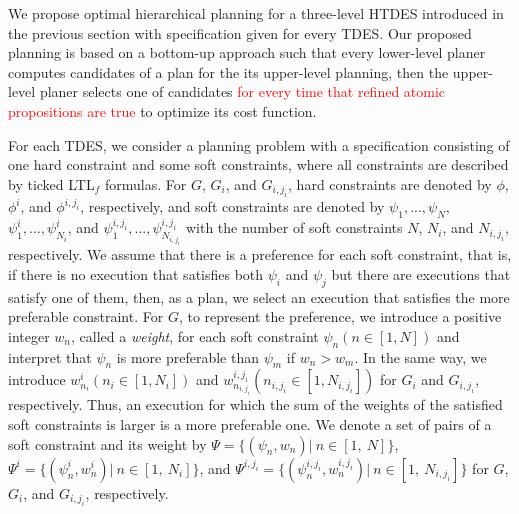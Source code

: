 \documentclass[journal,twoside,web]{IEEEtran}
\newcommand{\red}[1]{\textcolor{red}{#1}}
\begin{document}
We propose optimal hierarchical planning for a three-level HTDES introduced in the previous section with specification given for every TDES.
Our proposed planning is based on a bottom-up approach such that every lower-level planer computes candidates of a plan for the its upper-level planning, then the upper-level planer selects one of candidates \red{for every time that refined atomic propositions are true} to optimize its cost function.


For each TDES, we consider a planning problem with a specification consisting of one hard constraint and some soft constraints, where all constraints are described by ticked LTL$_f$ formulas. %
For $G$, $G_i$, and $G_{i,j_i}$, hard constraints are denoted by $\phi$, $\phi^i$, and $\phi^{i,j_i}$, respectively, and soft constraints are denoted by $\psi_1,...,\psi_N$, $\psi_1^i,...,\psi_{N_i}^i$, and $\psi_1^{i,j_i},...,\psi_{N_{i,j_i}}^{i,j_i}$ with the number of soft constraints $N$, $N_i$, and $N_{i,j_i}$, respectively. 
We assume that there is a preference for each soft constraint, that is, if there is no execution that satisfies both $\psi_i$ and $\psi_j$ but there are executions that satisfy one of them, then, as a plan, we select an execution that satisfies the more preferable constraint.  For $G$, to represent the preference, we introduce a positive integer $w_n$, called a {\sl weight}, for each soft constraint $\psi_n (n \in [1,N])$ and interpret that $\psi_n$ is more preferable than $\psi_m$ if $w_n >w_m$. 
In the same way, we introduce $w_{n_i}^i (n_i \in [1,N_i])$ and $w_{n_{i,j_i}}^{i,j_i} (n_{i,j_i} \in [1,N_{i,j_i}])$ for $G_i$ and $G_{i,j_i}$, respectively.
Thus, an execution for which the sum of the weights of the satisfied soft constraints is larger is a more preferable one.
We denote a set of pairs of a soft constraint and its weight by $\Psi=\{(\psi_n, w_n)|~n\in[1,~N]\}$, $\Psi^i=\{(\psi_n^i, w_n^i)|~n\in[1,~N_i]\}$, and $\Psi^{i,j_i}=\{(\psi_n^{i,j_i}, w_n^{i,j_i})|~n\in[1,~N_{i,j_i}]\}$ for $G$, $G_i$, and $G_{i,j_i}$, respectively.
\end{document}
